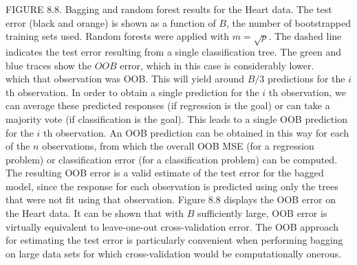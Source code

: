 \documentclass[10pt]{article}
\begin{document}
FIGURE 8.8. Bagging and random forest results for the Heart data. The test error (black and orange) is shown as a function of $B$, the number of bootstrapped training sets used. Random forests were applied with $m=\sqrt{p}$. The dashed line indicates the test error resulting from a single classification tree. The green and blue traces show the $O O B$ error, which in this case is considerably lower.\\
which that observation was OOB. This will yield around $B / 3$ predictions for the $i$ th observation. In order to obtain a single prediction for the $i$ th observation, we can average these predicted responses (if regression is the goal) or can take a majority vote (if classification is the goal). This leads to a single OOB prediction for the $i$ th observation. An OOB prediction can be obtained in this way for each of the $n$ observations, from which the overall OOB MSE (for a regression problem) or classification error (for a classification problem) can be computed. The resulting OOB error is a valid estimate of the test error for the bagged model, since the response for each observation is predicted using only the trees that were not fit using that observation. Figure 8.8 displays the OOB error on the Heart data. It can be shown that with $B$ sufficiently large, OOB error is virtually equivalent to leave-one-out cross-validation error. The OOB approach for estimating the test error is particularly convenient when performing bagging on large data sets for which cross-validation would be computationally onerous.
\end{document}
